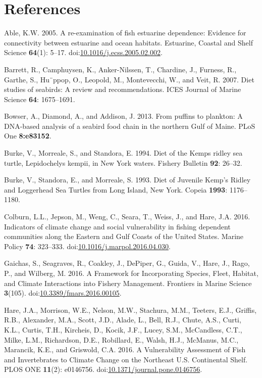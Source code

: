 \documentclass[11pt,]{article}
\begin{document}
\section*{References}\label{references}

\hypertarget{refs}{}
\hypertarget{ref-able_re-examination_2005}{}
Able, K.W. 2005. A re-examination of fish estuarine dependence: Evidence
for connectivity between estuarine and ocean habitats. Estuarine,
Coastal and Shelf Science \textbf{64}(1): 5--17.
doi:\href{https://doi.org/10.1016/j.ecss.2005.02.002}{10.1016/j.ecss.2005.02.002}.

\hypertarget{ref-barrett_diet_2007}{}
Barrett, R., Camphuysen, K., Anker-Nilssen, T., Chardine, J., Furness,
R., Garthe, S., Hu¨ppop, O., Leopold, M., Montevecchi, W., and Veit, R.
2007. Diet studies of seabirds: A review and recommendations. ICES
Journal of Marine Science \textbf{64}: 1675--1691.

\hypertarget{ref-bowser_puffins_2013}{}
Bowser, A., Diamond, A., and Addison, J. 2013. From puffins to plankton:
A DNA-based analysis of a seabird food chain in the northern Gulf of
Maine. PLoS One \textbf{8:e83152}.

\hypertarget{ref-burke_diet_1994}{}
Burke, V., Morreale, S., and Standora, E. 1994. Diet of the Kemps ridley
sea turtle, Lepidochelys kempii, in New York waters. Fishery Bulletin
\textbf{92}: 26--32.

\hypertarget{ref-burke_diet_1993}{}
Burke, V., Standora, E., and Morreale, S. 1993. Diet of Juvenile Kemp's
Ridley and Loggerhead Sea Turtles from Long Island, New York. Copeia
\textbf{1993}: 1176--1180.

\hypertarget{ref-colburn_indicators_2016}{}
Colburn, L.L., Jepson, M., Weng, C., Seara, T., Weiss, J., and Hare,
J.A. 2016. Indicators of climate change and social vulnerability in
fishing dependent communities along the Eastern and Gulf Coasts of the
United States. Marine Policy \textbf{74}: 323--333.
doi:\href{https://doi.org/10.1016/j.marpol.2016.04.030}{10.1016/j.marpol.2016.04.030}.

\hypertarget{ref-gaichas_framework_2016}{}
Gaichas, S., Seagraves, R., Coakley, J., DePiper, G., Guida, V., Hare,
J., Rago, P., and Wilberg, M. 2016. A Framework for Incorporating
Species, Fleet, Habitat, and Climate Interactions into Fishery
Management. Frontiers in Marine Science \textbf{3}(105).
doi:\href{https://doi.org/10.3389/fmars.2016.00105}{10.3389/fmars.2016.00105}.

\hypertarget{ref-hare_vulnerability_2016}{}
Hare, J.A., Morrison, W.E., Nelson, M.W., Stachura, M.M., Teeters, E.J.,
Griffis, R.B., Alexander, M.A., Scott, J.D., Alade, L., Bell, R.J.,
Chute, A.S., Curti, K.L., Curtis, T.H., Kircheis, D., Kocik, J.F.,
Lucey, S.M., McCandless, C.T., Milke, L.M., Richardson, D.E., Robillard,
E., Walsh, H.J., McManus, M.C., Marancik, K.E., and Griswold, C.A. 2016.
A Vulnerability Assessment of Fish and Invertebrates to Climate Change
on the Northeast U.S. Continental Shelf. PLOS ONE \textbf{11}(2):
e0146756.
doi:\href{https://doi.org/10.1371/journal.pone.0146756}{10.1371/journal.pone.0146756}.
\end{document}
